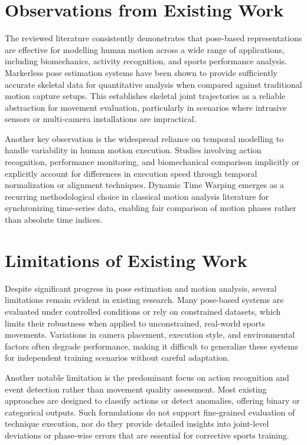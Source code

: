 \documentclass[12pt, a4paper]{report}
\begin{document}
\section{Observations from Existing Work}
The reviewed literature consistently demonstrates that pose-based representations are effective for modelling human motion across a wide range of applications, including biomechanics, activity recognition, and sports performance analysis. Markerless pose estimation systems have been shown to provide sufficiently accurate skeletal data for quantitative analysis when compared against traditional motion capture setups. This establishes skeletal joint trajectories as a reliable abstraction for movement evaluation, particularly in scenarios where intrusive sensors or multi-camera installations are impractical.

Another key observation is the widespread reliance on temporal modelling to handle variability in human motion execution. Studies involving action recognition, performance monitoring, and biomechanical comparison implicitly or explicitly account for differences in execution speed through temporal normalization or alignment techniques. Dynamic Time Warping emerges as a recurring methodological choice in classical motion analysis literature for synchronizing time-series data, enabling fair comparison of motion phases rather than absolute time indices.

\section{Limitations of Existing Work}
Despite significant progress in pose estimation and motion analysis, several limitations remain evident in existing research. Many pose-based systems are evaluated under controlled conditions or rely on constrained datasets, which limits their robustness when applied to unconstrained, real-world sports movements. Variations in camera placement, execution style, and environmental factors often degrade performance, making it difficult to generalize these systems for independent training scenarios without careful adaptation.

Another notable limitation is the predominant focus on action recognition and event detection rather than movement quality assessment. Most existing approaches are designed to classify actions or detect anomalies, offering binary or categorical outputs. Such formulations do not support fine-grained evaluation of technique execution, nor do they provide detailed insights into joint-level deviations or phase-wise errors that are essential for corrective sports training.
\end{document}
